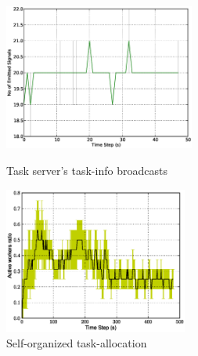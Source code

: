 \documentclass{llncs}
\begin{document}
\begin{figure}
\begin{minipage}[t]{0.48\linewidth}
\centering
\includegraphics[height=4.8cm, angle=0]
{images/Global-SignalingFreqStat.eps}
\caption{\small Task server's task-info broadcasts}
\label{fig:signal-frequency-stat}
%
\end{minipage}
\hspace{0.5cm}
\begin{minipage}[t]{0.48\linewidth}
\centering
\includegraphics[height=4.8cm, angle=0]{images/WorkerRatio.eps}
\caption{\small Self-organized task-allocation}
\label{fig:worker-stat} %
\end{minipage}
\end{figure}
\end{document}
